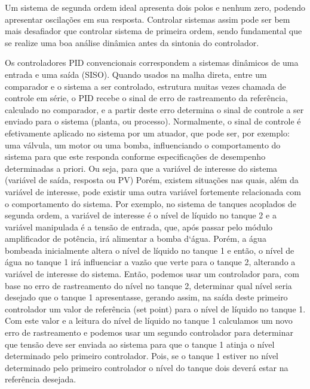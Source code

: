 \documentclass[a4paper,12pt]{article}
\begin{document}
\begin{flushleft}
\begin{flushleft}

\hspace{4ex}Um sistema de segunda ordem ideal apresenta dois polos e nenhum zero, podendo apresentar oscilações em sua resposta. Controlar sistemas assim pode ser bem mais desafiador que controlar sistema de primeira ordem, sendo fundamental que se realize uma boa análise dinâmica antes da sintonia do controlador.


\hspace{4ex}Os controladores PID convencionais correspondem a sistemas dinâmicos de uma entrada e uma saída (SISO). Quando usados na malha direta, entre um comparador e o sistema a ser controlado, estrutura muitas vezes chamada de controle em série, o PID recebe o sinal de erro de rastreamento da referência, calculado no comparador, e a partir deste erro determina o sinal de controle a ser enviado para o sistema (planta, ou processo). Normalmente, o sinal de controle é efetivamente aplicado no sistema por um atuador, que pode ser, por exemplo: uma válvula, um motor ou uma bomba, influenciando o comportamento do sistema para que este responda conforme especificações de desempenho determinadas a priori. Ou seja, para que a variável de interesse do sistema (variável de saída, resposta ou PV) Porém, existem situações nas quais, além da variável de interesse, pode existir uma outra variável fortemente relacionada com o comportamento do sistema. Por exemplo, no sistema de tanques acoplados de segunda ordem, a variável de interesse é o nível de líquido no tanque 2 e a variável manipulada é a tensão de entrada, que, após passar pelo módulo amplificador de potência, irá alimentar a bomba d`água. Porém, a água bombeada inicialmente altera o nível de líquido no tanque 1 e então, o nível de água no tanque 1 irá influenciar a vazão que verte para o tanque 2, alterando a variável de interesse do sistema. Então, podemos usar um controlador para, com base no erro de rastreamento do nível no tanque 2, determinar qual nível seria desejado que o tanque 1 apresentasse, gerando assim, na saída deste primeiro controlador um valor de referência (set point) para o nível de líquido no tanque 1. Com este valor e a leitura do nível de líquido no tanque 1 calculamos um novo erro de rastreamento e podemos usar um segundo controlador para determinar que tensão deve ser enviada ao sistema para que o tanque 1 atinja o nível determinado pelo primeiro controlador. Pois, se o tanque 1 estiver no nível determinado pelo primeiro controlador o nível do tanque dois deverá estar na referência desejada.


\end{flushleft}
\end{flushleft}
\end{document}
